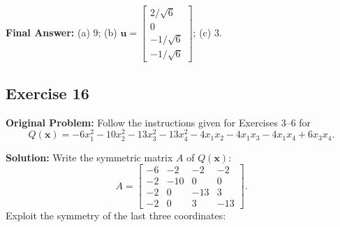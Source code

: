 \documentclass[11pt, letterpaper]{article}
\theoremstyle{definition}
\theoremstyle{remark}
\begin{document}
\textbf{Final Answer:} (a) $9$; (b) $\mathbf{u} = \begin{bmatrix} 2/\sqrt{6} \\ 0 \\ -1/\sqrt{6} \\ -1/\sqrt{6} \end{bmatrix}$; (c) $3$.

\subsection{Exercise 16}
\textbf{Original Problem:} Follow the instructions given for Exercises 3–6 for
\[
Q(\mathbf{x}) = -6x_1^2 - 10x_2^2 - 13x_3^2 - 13x_4^2 - 4x_1x_2 - 4x_1x_3 - 4x_1x_4 + 6x_3x_4.
\]

\textbf{Solution:}
Write the symmetric matrix $A$ of $Q(\mathbf{x})$:
\[
A = \begin{bmatrix} -6 & -2 & -2 & -2 \\ -2 & -10 & 0 & 0 \\ -2 & 0 & -13 & 3 \\ -2 & 0 & 3 & -13 \end{bmatrix}.
\]
Exploit the symmetry of the last three coordinates:
\end{document}

